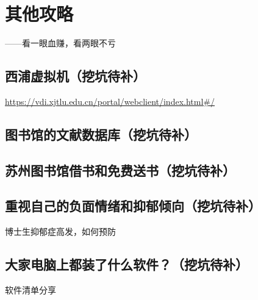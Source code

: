 
\chapter{其他攻略}

\begin{flushright}
    ——看一眼血赚，看两眼不亏
\end{flushright}

 \clearpage

 \clearpage

 \clearpage

\section{西浦虚拟机（挖坑待补）}
\url{https://vdi.xjtlu.edu.cn/portal/webclient/index.html#/}
\section{图书馆的文献数据库（挖坑待补）}
\section{苏州图书馆借书和免费送书（挖坑待补）}
\section{重视自己的负面情绪和抑郁倾向（挖坑待补）}
博士生抑郁症高发，如何预防
\section{大家电脑上都装了什么软件？（挖坑待补）}
软件清单分享
